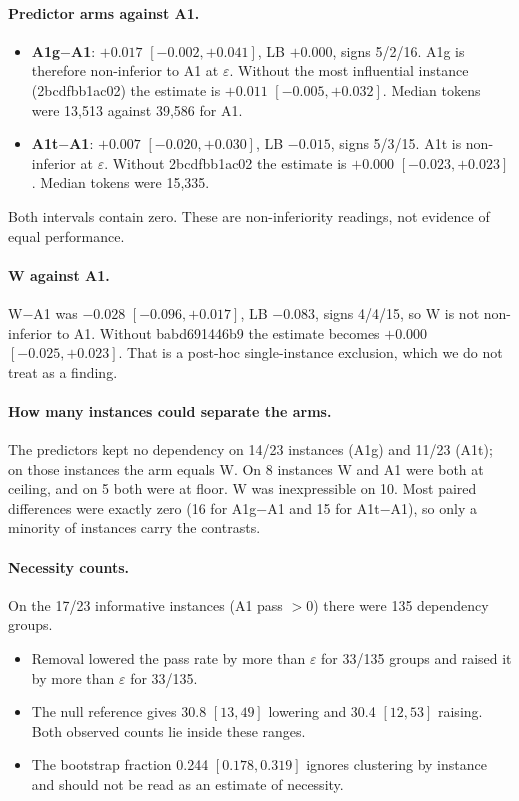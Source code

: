 \documentclass[10pt]{article}
\newcommand{\eps}{\varepsilon}
\begin{document}
\paragraph{Predictor arms against A1.}
\begin{itemize}
\item \textbf{A1g$-$A1}: $+0.017$ $[-0.002, +0.041]$, LB $+0.000$, signs 5/2/16. A1g is therefore non-inferior to A1 at $\eps$. Without the most influential instance (2bcdfbb1ac02) the estimate is $+0.011$ $[-0.005, +0.032]$. Median tokens were 13,513 against 39,586 for A1.
\item \textbf{A1t$-$A1}: $+0.007$ $[-0.020, +0.030]$, LB $-0.015$, signs 5/3/15. A1t is non-inferior at $\eps$. Without 2bcdfbb1ac02 the estimate is $+0.000$ $[-0.023, +0.023]$. Median tokens were 15,335.
\end{itemize}
Both intervals contain zero. These are non-inferiority readings, not evidence of equal performance.

\paragraph{W against A1.} W$-$A1 was $-0.028$ $[-0.096, +0.017]$, LB $-0.083$, signs 4/4/15, so W is not non-inferior to A1. Without babd691446b9 the estimate becomes $+0.000$ $[-0.025, +0.023]$. That is a post-hoc single-instance exclusion, which we do not treat as a finding.

\paragraph{How many instances could separate the arms.} The predictors kept no dependency on 14/23 instances (A1g) and 11/23 (A1t); on those instances the arm equals W. On 8 instances W and A1 were both at ceiling, and on 5 both were at floor. W was inexpressible on 10. Most paired differences were exactly zero (16 for A1g$-$A1 and 15 for A1t$-$A1), so only a minority of instances carry the contrasts.

\paragraph{Necessity counts.} On the 17/23 informative instances (A1 pass $> 0$) there were 135 dependency groups.
\begin{itemize}
\item Removal lowered the pass rate by more than $\eps$ for 33/135 groups and raised it by more than $\eps$ for 33/135.
\item The null reference gives 30.8 $[13, 49]$ lowering and 30.4 $[12, 53]$ raising. Both observed counts lie inside these ranges.
\item The bootstrap fraction 0.244 $[0.178, 0.319]$ ignores clustering by instance and should not be read as an estimate of necessity.
\end{itemize}
\end{document}
